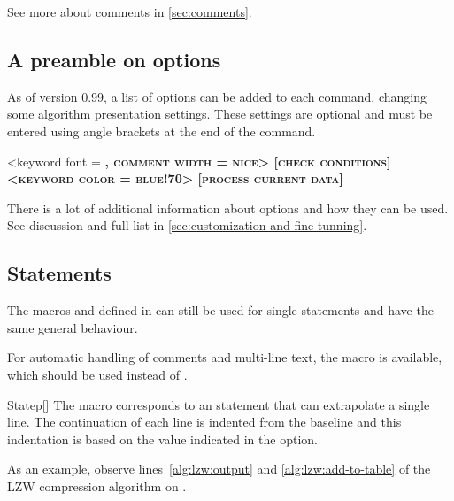 \documentclass[a4paper, 11pt]{article}
\begin{document}
See more about comments in \cref{sec:comments}.

\subsection{A preamble on options}\label{sec:a-preamble-on-options}
As of version 0.99, a list of options can be added to each command, changing some algorithm presentation settings. These settings are optional and must be entered using angle brackets at the end of the command.

\begin{tcblisting}{}
    \begin{algorithmic}<keyword font = \scshape\bfseries, comment width = nice>
        [check conditions]
            <keyword color = blue!70>
                [process current data]
            \EndWhile
        \EndIf
    \end{algorithmic}
\end{tcblisting}

There is a lot of additional information about options and how they can be used. See discussion and full list in \cref{sec:customization-and-fine-tunning}.

\subsection{Statements}\label{sec:statements}

The macros  and  defined in  can still be used for single statements and have the same general behaviour.

For automatic handling of comments and multi-line text, the  macro is available, which should be used instead of .

\begin{macro}{Statep}[]
    The  macro corresponds to an statement that can extrapolate a single line. The continuation of each line is indented from the baseline and this indentation is based on the value indicated in the  option.

    \MacroOptionsText
\end{macro}

As an example, observe lines~\ref{alg:lzw:output} and \ref{alg:lzw:add-to-table} of the LZW compression algorithm on .
\end{document}
